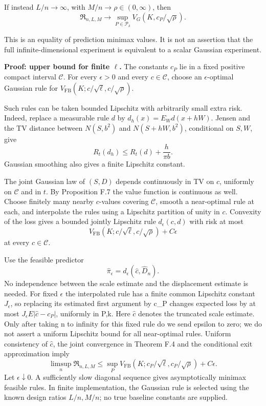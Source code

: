 If instead \(L/n\to\infty\), with \(M/n\to\rho\in(0,\infty)\), then \[
\boxed{
\mathfrak R_{n,L,M}\longrightarrow
\sup_{P\in\mathcal P_\delta}V_G(K,c_P/\sqrt\rho).
}
\tag{F.51}
\]

This is an equality of prediction minimax values. It is not an assertion
that the full infinite-dimensional experiment is equivalent to a scalar
Gaussian experiment.

\textbf{Proof: upper bound for finite \(\ell\).} The constants \(c_P\)
lie in a fixed positive compact interval \(\mathcal C\). For every
\(\epsilon>0\) and every \(c\in\mathcal C\), choose an
\(\epsilon\)-optimal Gaussian rule for
\(V_{\mathrm{FB}}(K;c/\sqrt\ell,c/\sqrt\rho)\).

Such rules can be taken bounded Lipschitz with arbitrarily small extra
risk. Indeed, replace a measurable rule \(d\) by \(d_h(x)=E_Wd(x+hW)\).
Jensen and the TV distance between \(N(S,b^2)\) and \(N(S+hW,b^2)\),
conditional on \(S,W\), give \[
R_t(d_h)\le R_t(d)+\frac{h}{\pi b}.
\tag{F.52}
\] Gaussian smoothing also gives a finite Lipschitz constant.

The joint Gaussian law of \((S,D)\) depends continuously in TV on \(c\),
uniformly on \(\mathcal C\) and in \(t\). By Proposition F.7 the value
function is continuous as well. Choose finitely many nearby \(c\)-values
covering \(\mathcal C\), smooth a near-optimal rule at each, and
interpolate the rules using a Lipschitz partition of unity in \(c\).
Convexity of the loss gives a bounded jointly Lipschitz rule
\(d_\epsilon(c,d)\) with risk at most \[
V_{\mathrm{FB}}(K;c/\sqrt\ell,c/\sqrt\rho)+C\epsilon
\] at every \(c\in\mathcal C\).

Use the feasible predictor \[
\widehat\pi_\epsilon
=d_\epsilon(\widehat c,\widehat D_n).
\tag{F.53}
\] No independence between the scale estimate and the displacement
estimate is needed. For fixed \(\epsilon\) the interpolated rule has a
finite common Lipschitz constant \(J_\epsilon\), so replacing its
estimated first argument by c\_P changes expected loss by at most
\(J_\epsilon E|\widehat c-c_P|\), uniformly in P,k. Here \(\widehat c\)
denotes the truncated scale estimate. Only after taking n to infinity
for this fixed rule do we send epsilon to zero; we do not assert a
uniform Lipschitz bound for all near-optimal rules. Uniform consistency
of \(\widehat c\), the joint convergence in Theorem F.4 and the
conditional exit approximation imply \[
\limsup_n\mathfrak R_{n,L,M}
\le
\sup_PV_{\mathrm{FB}}(K;c_P/\sqrt\ell,c_P/\sqrt\rho)
+C\epsilon.
\] Let \(\epsilon\downarrow0\). A sufficiently slow diagonal sequence
gives asymptotically minimax feasible rules. In finite implementation,
the Gaussian rule is selected using the known design ratios \(L/n,M/n\);
no true baseline constants are supplied.

